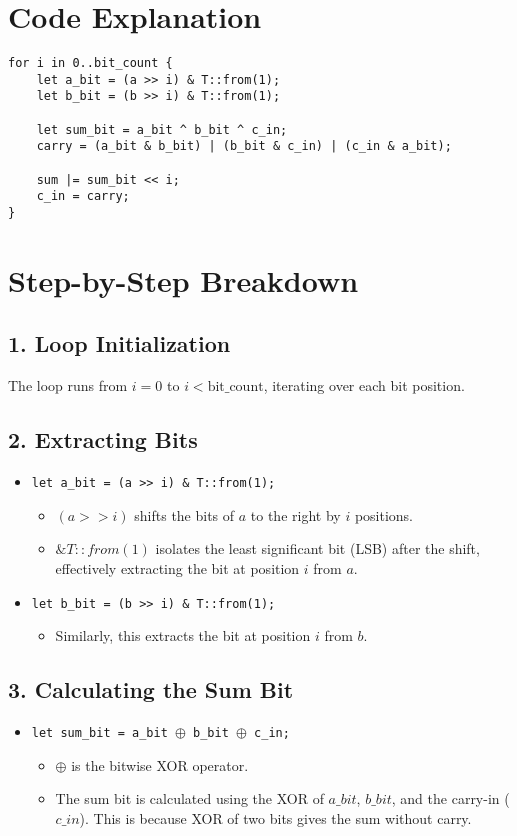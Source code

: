 \documentclass{article}
\begin{document}
\section*{Code Explanation}

\begin{verbatim}
for i in 0..bit_count {
    let a_bit = (a >> i) & T::from(1);
    let b_bit = (b >> i) & T::from(1);

    let sum_bit = a_bit ^ b_bit ^ c_in;
    carry = (a_bit & b_bit) | (b_bit & c_in) | (c_in & a_bit);

    sum |= sum_bit << i;
    c_in = carry;
}
\end{verbatim}

\section*{Step-by-Step Breakdown}

\subsection*{1. Loop Initialization}
The loop runs from \(i = 0\) to \(i < \text{bit\_count}\), iterating over each bit position.

\subsection*{2. Extracting Bits}
\begin{itemize}
    \item \texttt{let a\_bit = (a >> i) \& T::from(1);}
    \begin{itemize}
        \item \((a >> i)\) shifts the bits of \(a\) to the right by \(i\) positions.
        \item \(\& T::from(1)\) isolates the least significant bit (LSB) after the shift, effectively extracting the bit at position \(i\) from \(a\).
    \end{itemize}
    \item \texttt{let b\_bit = (b >> i) \& T::from(1);}
    \begin{itemize}
        \item Similarly, this extracts the bit at position \(i\) from \(b\).
    \end{itemize}
\end{itemize}

\subsection*{3. Calculating the Sum Bit}
\begin{itemize}
    \item \texttt{let sum\_bit = a\_bit \(\oplus\) b\_bit \(\oplus\) c\_in;}
    \begin{itemize}
        \item \(\oplus\) is the bitwise XOR operator.
        \item The sum bit is calculated using the XOR of \(a\_bit\), \(b\_bit\), and the carry-in (\(c\_in\)). This is because XOR of two bits gives the sum without carry.
    \end{itemize}
\end{itemize}
\end{document}
